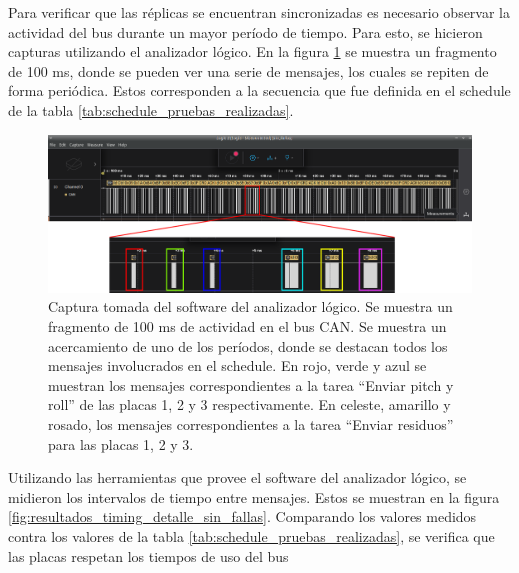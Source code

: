 
Para verificar que las réplicas se encuentran sincronizadas es necesario observar la actividad del bus durante un mayor período de tiempo. Para esto, se hicieron capturas utilizando el analizador lógico. En la figura \ref{fig:resultados_timing_sin_fallas} se muestra un fragmento de 100 ms, donde se pueden ver una serie de mensajes, los cuales se repiten de forma periódica. Estos corresponden a la secuencia que fue definida en el schedule de la tabla \ref{tab:schedule_pruebas_realizadas}.


\begin{figure}[!t]
    \centering
    \includegraphics[width=\textwidth]{img/resultados_timing_sin_fallas_zoom.png}
    \caption{Captura tomada del software del analizador lógico. Se muestra un fragmento de 100 ms de actividad en el bus CAN. Se muestra un acercamiento de uno de los períodos, donde se destacan todos los mensajes involucrados en el schedule. En rojo, verde y azul se muestran los mensajes correspondientes a la tarea ``Enviar pitch y roll'' de las placas 1, 2 y 3 respectivamente. En celeste, amarillo y rosado, los mensajes correspondientes a la tarea ``Enviar residuos'' para las placas 1, 2 y 3.}
    \label{fig:resultados_timing_sin_fallas}
\end{figure}

Utilizando las herramientas que provee el software del analizador lógico, se midieron los intervalos de tiempo entre mensajes. Estos se muestran en la figura \ref{fig:resultados_timing_detalle_sin_fallas}. Comparando los valores medidos contra los valores de la tabla \ref{tab:schedule_pruebas_realizadas}, se verifica que las placas respetan los tiempos de uso del bus

